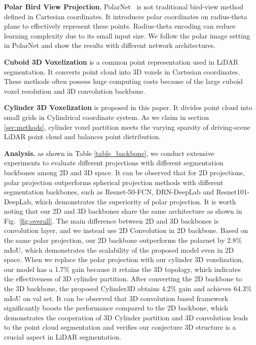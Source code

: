 \documentclass{article}
\begin{document}
\textbf{Polar Bird View Projection}, PolarNet~\citep{zhang2020polarnet} is not traditional bird-view method defined in Cartesian coordinates. It introduces polar coordinates on radius-theta plane to effectively represent these points. Radius-theta encoding can reduce learning complexity due to its small input size. We follow the polar image setting in PolarNet and show the results with different network architectures.

\textbf{Cuboid 3D Voxelization} is a common point representation used in LiDAR segmentation. It converts  point cloud into 3D voxels in Cartesian coordinates. These methods often possess huge computing costs because of the large cuboid voxel resolution and 3D convolution backbone.

\textbf{Cylinder 3D Voxelization} is proposed in this paper. It divides point cloud into small grids in Cylindrical coordinate system. As we claim in section \ref{sec:methods}, cylinder voxel partition meets the varying sparsity of driving-scene LiDAR point cloud and balances point distribution.

\textbf{Analysis.} as shown in Table \ref{table_backbone}, we conduct extensive experiments to evaluate different projections with different segmentation backbones among 2D and 3D space. 
It can be observed that for 2D projections, polar projection outperforms spherical projection methods with different segmentation backbones, such as Resnet-50-FCN, DRN-DeepLab and Resnet101-DeepLab, which demonstrates the superiority of polar projection. 
It is worth noting that our 2D and 3D backbones share the same architecture as shown in Fig.~\ref{fig:overall}. The main difference between 2D and 3D backbones is convolution layer, and we instead use 2D Convolution in 2D backbone.
Based on the same polar projection, our 2D backbone outperforms the polarnet by 2.8\% mIoU, which demonstrates the scalability of the proposed model even in 2D space. 
When we replace the polar projection with our cylinder 3D voxelization, our model has a 1.7\% gain because it retains the 3D topology, which indicates the effectiveness of 3D cylinder partition. 
After converting the 2D backbone to the 3D backbone, the proposed Cylinder3D obtains 4.2\% gain and achieves 64.3\% mIoU on val set. It can be observed that 3D convolution based framework significantly boosts the performance compared to the 2D backbone, which demonstrates the cooperation of 3D Cylinder partition and 3D convolution leads to the point cloud segmentation and verifies our conjecture 3D structure is a crucial aspect in LiDAR segmentation.
\end{document}
